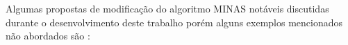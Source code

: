   




Algumas propostas de modificação do algoritmo MINAS notáveis discutidas durante o desenvolvimento
deste trabalho 
porém alguns exemplos mencionados não abordados são \cite{DaSilva2018,DaSilva2018thesis,Costa2019}:

